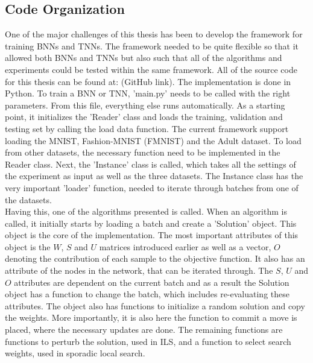 
\subsection{Code Organization}

One of the major challenges of this thesis has been to develop the framework for training BNNs and TNNs. The framework needed to be quite flexible so that it allowed both BNNs and TNNs but also such that all of the algorithms and experiments could be tested within the same framework. All of the source code for this thesis can be found at: (GitHub link). The implementation is done in Python. To train a BNN or TNN, 'main.py' needs to be called with the right parameters. From this file, everything else runs automatically. As a starting point, it initializes the 'Reader' class and loads the training, validation and testing set by calling the load data function. The current framework support loading the MNIST, Fashion-MNIST (FMNIST) and the Adult dataset. To load from other datasets, the necessary function need to be implemented in the Reader class. Next, the 'Instance' class is called, which takes all the settings of the experiment as input as well as the three datasets. The Instance class has the very important 'loader' function, needed to iterate through batches from one of the datasets. \\

\noindent Having this, one of the algorithms presented is called. When an algorithm is called, it initially starts by loading a batch and create a 'Solution' object. This object is the core of the implementation. The most important attributes of this object is the $W$, $S$ and $U$ matrices introduced earlier as well as a vector, $O$ denoting the contribution of each sample to the objective function. It also has an attribute of the nodes in the network, that can be iterated through. The $S$, $U$ and $O$ attributes are dependent on the current batch and as a result the Solution object has a function to change the batch, which includes re-evaluating these attributes. The object also has functions to initialize a random solution and copy the weights. More importantly, it is also here the function to commit a move is placed, where the necessary updates are done. The remaining functions are functions to perturb the solution, used in ILS, and a function to select search weights, used in sporadic local search. \\

